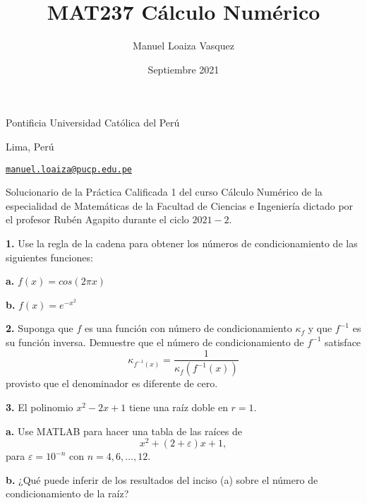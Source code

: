 \documentclass{article}
\title{MAT237 C\'alculo Num\'erico}
\author{Manuel Loaiza Vasquez}
\date{Septiembre 2021}
\newenvironment{statement}[1]{\smallskip\noindent\color[rgb]{1.00,0.00,0.50} {\bf #1.}}{}
\theoremstyle{definition}
\theoremstyle{remark}
\begin{document}
\maketitle

\vspace*{-0.25in}
\centerline{Pontificia Universidad Cat\'olica del Per\'u}
\centerline{Lima, Per\'u}
\centerline{\href{mailto:manuel.loaiza@pucp.edu.pe}{{\tt manuel.loaiza@pucp.edu.pe}}}
\vspace*{0.15in}

\begin{framed}
  Solucionario de la Pr\'actica Calificada 1 del curso C\'alculo Num\'erico
  de la especialidad de Matem\'aticas de la Facultad de Ciencias e Ingenier\'ia
  dictado por el profesor Rub\'en Agapito durante el ciclo $2021-2$.
\end{framed}

\begin{statement}{1}
  Use la regla de la cadena para obtener los n\'umeros de condicionamiento de
  las siguientes funciones:
\end{statement}

\begin{statement}{a}
  $f(x) = cos(2 \pi x)$
\end{statement}

\begin{statement}{b}
  $f(x) = e^{-x^2}$
\end{statement}

\begin{statement}{2}
  Suponga que $f$ es una funci\'on con n\'umero de condicionamiento
  $\kappa_f$ y que $f^{-1}$ es su funci\'on inversa. Demuestre que el n\'umero
  de condicionamiento de $f^{-1}$ satisface
  \[
    \kappa_{f^{-1}(x)} = \frac{1}{\kappa_f(f^{-1}(x))}
  \]
  provisto que el denominador es diferente de cero.
\end{statement}

\begin{statement}{3}
  El polinomio $x^2 - 2x + 1$ tiene una ra\'iz doble en $r = 1$.
\end{statement}

\begin{statement}{a}
  Use MATLAB para hacer una tabla de las ra\'ices de
  \[
    x^2 + (2 + \varepsilon)x + 1,  
  \]
  para $\varepsilon = 10^{-n}$ con $n = 4, 6, \dots, 12$.
\end{statement}

\begin{statement}{b}
  ¿Qu\'e puede inferir de los resultados del inciso (a) sobre el n\'umero de
  condicionamiento de la ra\'iz?
\end{statement}
\end{document}
